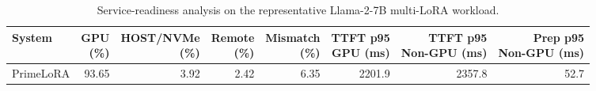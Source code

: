 \begin{table}[t]
\centering
\caption{Service-readiness analysis on the representative Llama-2-7B multi-LoRA workload.}
\label{tab:service_readiness}
\setlength{\tabcolsep}{2.4pt}
\renewcommand{\arraystretch}{1.10}
\begin{tabular}{lrrrrrrr}
\hline
System & \shortstack{GPU\\(\%)} & \shortstack{HOST/NVMe\\(\%)} & \shortstack{Remote\\(\%)} & \shortstack{Mismatch\\(\%)} & \shortstack{TTFT p95\\GPU (ms)} & \shortstack{TTFT p95\\Non-GPU (ms)} & \shortstack{Prep p95\\Non-GPU (ms)} \\
\hline
PrimeLoRA & 93.65 & 3.92 & 2.42 & 6.35 & 2201.9 & 2357.8 & 52.7 \\
\hline
\end{tabular}
\end{table}

